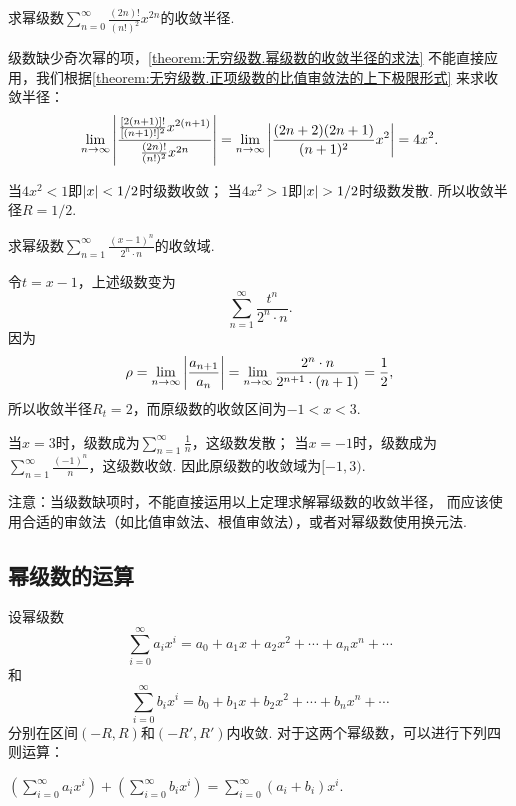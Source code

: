 \begin{example}
求幂级数\(\sum\limits_{n=0}^{\infty} \frac{(2n)!}{(n!)^2} x^{2n}\)的收敛半径.
\begin{solution}
级数缺少奇次幂的项，\cref{theorem:无穷级数.幂级数的收敛半径的求法} 不能直接应用，我们根据\cref{theorem:无穷级数.正项级数的比值审敛法的上下极限形式} 来求收敛半径：\[
\lim\limits_{n\to\infty} \abs{\frac{
	\frac{[2(n+1)]!}{[(n+1)!]^2} x^{2(n+1)}
}{
	\frac{(2n)!}{(n!)^2} x^{2n}
}}
= \lim\limits_{n\to\infty} \abs{\frac{(2n+2)(2n+1)}{(n+1)^2} x^2}
= 4 x^2.
\]

当\(4 x^2 < 1\)即\(\abs{x} < 1/2\)时级数收敛；
当\(4 x^2 > 1\)即\(\abs{x} > 1/2\)时级数发散.
所以收敛半径\(R = 1/2\).
\end{solution}
\end{example}

\begin{example}
求幂级数\(\sum\limits_{n=1}^{\infty} \frac{(x-1)^n}{2^n \cdot n}\)的收敛域.
\begin{solution}
令\(t = x-1\)，上述级数变为\[
\sum\limits_{n=1}^{\infty} \frac{t^n}{2^n \cdot n}.
\]因为\[
\rho = \lim\limits_{n\to\infty} \abs{\frac{a_{n+1}}{a_n}} = \lim\limits_{n\to\infty} \frac{2^n \cdot n}{2^{n+1} \cdot (n+1)} = \frac{1}{2},
\]所以收敛半径\(R_t = 2\)，而原级数的收敛区间为\(-1<x<3\).

当\(x=3\)时，级数成为\(\sum\limits_{n=1}^{\infty} \frac{1}{n}\)，这级数发散；
当\(x=-1\)时，级数成为\(\sum\limits_{n=1}^{\infty} \frac{(-1)^n}{n}\)，这级数收敛.
因此原级数的收敛域为\([-1,3)\).
\end{solution}
\end{example}

注意：当级数缺项时，不能直接运用以上定理求解幂级数的收敛半径，%
而应该使用合适的审敛法（如比值审敛法、根值审敛法），或者对幂级数使用换元法.

\subsection{幂级数的运算}
设幂级数\[
\sum\limits_{i=0}^{\infty} a_i x^i
= a_0 + a_1 x + a_2 x^2 + \dotsb + a_n x^n + \dotsb
\]和\[
\sum\limits_{i=0}^{\infty} b_i x^i
= b_0 + b_1 x + b_2 x^2 + \dotsb + b_n x^n + \dotsb
\]分别在区间\((-R,R)\)和\((-R',R')\)内收敛.
对于这两个幂级数，可以进行下列四则运算：

\begin{definition}[幂级数的加法]
\(\left(\sum\limits_{i=0}^{\infty} a_i x^i\right)
+ \left(\sum\limits_{i=0}^{\infty} b_i x^i\right)
= \sum\limits_{i=0}^{\infty} (a_i+b_i) x^i\).
\end{definition}

